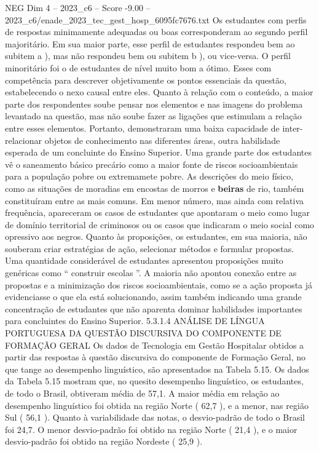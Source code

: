 \begin{textsample}{NEG Dim 4 – 2023\_c6 – Score -9.00 – 2023\_c6/enade\_2023\_tec\_gest\_hosp\_6095fc7676.txt}
Os estudantes com perfis de respostas minimamente adequadas ou boas corresponderam ao segundo perfil majoritário.
Em sua maior parte, esse perfil de estudantes respondeu bem ao subitem a ), mas não respondeu bem ou subitem b ), ou vice-versa.
O perfil minoritário foi o de estudantes de nível muito bom a ótimo.
Esses com competência para descrever objetivamente os pontos essenciais da questão, estabelecendo o nexo causal entre eles.
Quanto à relação com o conteúdo, a maior parte dos respondentes soube pensar nos elementos e nas imagens do problema levantado na questão, mas não soube fazer as ligações que estimulam a relação entre esses elementos.
Portanto, demonstraram uma baixa capacidade de inter-relacionar objetos de conhecimento nas diferentes áreas, outra habilidade esperada de um concluinte do Ensino Superior.
Uma grande parte dos estudantes vê o saneamento básico precário como a maior fonte de riscos socioambientais para a população pobre ou extremamete pobre.
As descrições do meio físico, como as situações de moradias em encostas de morros e \textbf{beiras} de rio, também constituíram entre as mais comuns.
Em menor número, mas ainda com relativa frequência, apareceram os casos de estudantes que apontaram o meio como lugar de domínio territorial de criminosos ou os casos que indicaram o meio social como opressivo aos negros.
Quanto às proposições, os estudantes, em sua maioria, não souberam criar estratégias de ação, selecionar métodos e formular propostas.
Uma quantidade considerável de estudantes apresentou proposições muito genéricas como “ construir escolas ”.
A maioria não apontou conexão entre as propostas e a minimização dos riscos socioambientais, como se a ação proposta já evidenciasse o que ela está solucionando, assim também indicando uma grande concentração de estudantes que não aparenta dominar habilidades importantes para concluintes do Ensino Superior. 5.3.1.4 ANÁLISE DE LÍNGUA PORTUGUESA DA QUESTÃO DISCURSIVA DO COMPONENTE DE FORMAÇÃO GERAL Os dados de Tecnologia em Gestão Hospitalar obtidos a partir das respostas à questão discursiva do componente de Formação Geral, no que tange ao desempenho linguístico, são apresentados na Tabela 5.15.
Os dados da Tabela 5.15 mostram que, no quesito desempenho linguístico, os estudantes, de todo o Brasil, obtiveram média de 57,1.
A maior média em relação ao desempenho linguístico foi obtida na região Norte ( 62,7 ), e a menor, nas região Sul ( 56,1 ).
Quanto à variabilidade das notas, o desvio-padrão de todo o Brasil foi 24,7.
O menor desvio-padrão foi obtido na região Norte ( 21,4 ), e o maior desvio-padrão foi obtido na região Nordeste ( 25,9 ).

\end{textsample}
